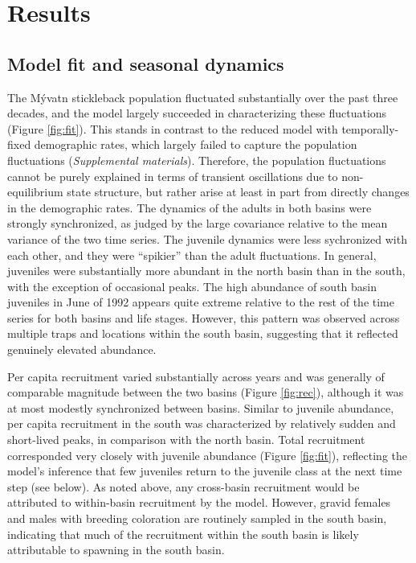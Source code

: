 \section*{Results}



\subsection*{Model fit and seasonal dynamics} 

The M\'{y}vatn stickleback population fluctuated substantially over the past
three decades, 
and the model largely succeeded in characterizing these fluctuations 
(Figure \ref{fig:fit}).
This stands in contrast to the reduced model with temporally-fixed demographic rates,
which largely failed to capture the population fluctuations (\emph{Supplemental materials}).
Therefore, the population fluctuations cannot be purely explained 
in terms of transient oscillations due to non-equilibrium state structure, 
but rather arise at least in part from directly changes in the demographic rates. 
The dynamics of the adults in both basins were strongly synchronized,
as judged by the large covariance relative to the mean variance of the two time series.
The juvenile dynamics were less sychronized with each other,
and they were ``spikier'' than the adult fluctuations.
In general, juveniles were substantially more abundant in the north basin than in the south,
with the exception of occasional peaks. 
The high abundance of south basin juveniles in June of 1992 appears quite extreme
relative to the rest of the time series for both basins and life stages.
However, this pattern was observed across multiple traps and locations within the south basin,
suggesting that it reflected genuinely elevated abundance.

Per capita recruitment varied substantially across years and was generally of comparable
magnitude between the two basins (Figure \ref{fig:rec}),
although it was at most modestly synchronized between basins.
Similar to juvenile abundance, per capita recruitment in the south 
was characterized by relatively sudden and short-lived peaks, 
in comparison with the north basin.
Total recruitment corresponded very closely with juvenile abundance (Figure \ref{fig:fit}),
reflecting the model's inference 
that few juveniles return to the juvenile class at the next time step (see below).
As noted above, 
any cross-basin recruitment would be attributed 
to within-basin recruitment by the model. 
However, gravid females and males with breeding coloration are routinely sampled in the 
south basin, indicating that much of the recruitment within the south basin is 
likely attributable to spawning in the south basin.

